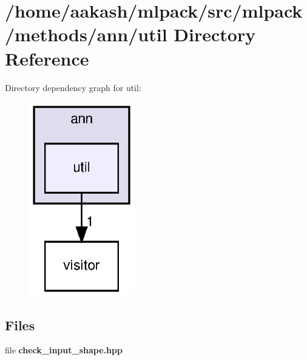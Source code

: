 \section{/home/aakash/mlpack/src/mlpack/methods/ann/util Directory Reference}
\label{dir_13a231355eb622cbab9275b263aa86cd}
Directory dependency graph for util\+:
\nopagebreak
\begin{figure}[H]
\begin{center}
\leavevmode
\includegraphics[width=130pt]{dir_13a231355eb622cbab9275b263aa86cd_dep}
\end{center}
\end{figure}
\subsection*{Files}
\begin{DoxyCompactItemize}
\item 
file \textbf{ check\+\_\+input\+\_\+shape.\+hpp}
\end{DoxyCompactItemize}
